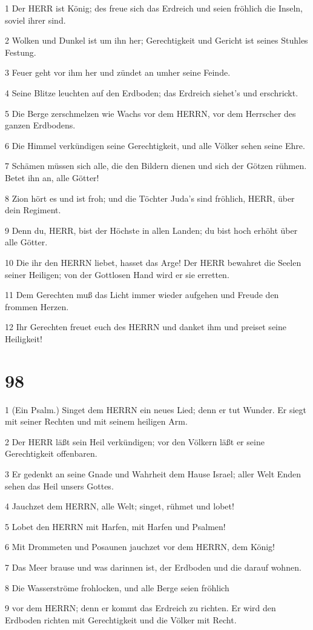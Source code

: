 \par 1 Der HERR ist König; des freue sich das Erdreich und seien fröhlich die Inseln, soviel ihrer sind.
\par 2 Wolken und Dunkel ist um ihn her; Gerechtigkeit und Gericht ist seines Stuhles Festung.
\par 3 Feuer geht vor ihm her und zündet an umher seine Feinde.
\par 4 Seine Blitze leuchten auf den Erdboden; das Erdreich siehet's und erschrickt.
\par 5 Die Berge zerschmelzen wie Wachs vor dem HERRN, vor dem Herrscher des ganzen Erdbodens.
\par 6 Die Himmel verkündigen seine Gerechtigkeit, und alle Völker sehen seine Ehre.
\par 7 Schämen müssen sich alle, die den Bildern dienen und sich der Götzen rühmen. Betet ihn an, alle Götter!
\par 8 Zion hört es und ist froh; und die Töchter Juda's sind fröhlich, HERR, über dein Regiment.
\par 9 Denn du, HERR, bist der Höchste in allen Landen; du bist hoch erhöht über alle Götter.
\par 10 Die ihr den HERRN liebet, hasset das Arge! Der HERR bewahret die Seelen seiner Heiligen; von der Gottlosen Hand wird er sie erretten.
\par 11 Dem Gerechten muß das Licht immer wieder aufgehen und Freude den frommen Herzen.
\par 12 Ihr Gerechten freuet euch des HERRN und danket ihm und preiset seine Heiligkeit!

\chapter{98}

\par 1 (Ein Psalm.) Singet dem HERRN ein neues Lied; denn er tut Wunder. Er siegt mit seiner Rechten und mit seinem heiligen Arm.
\par 2 Der HERR läßt sein Heil verkündigen; vor den Völkern läßt er seine Gerechtigkeit offenbaren.
\par 3 Er gedenkt an seine Gnade und Wahrheit dem Hause Israel; aller Welt Enden sehen das Heil unsers Gottes.
\par 4 Jauchzet dem HERRN, alle Welt; singet, rühmet und lobet!
\par 5 Lobet den HERRN mit Harfen, mit Harfen und Psalmen!
\par 6 Mit Drommeten und Posaunen jauchzet vor dem HERRN, dem König!
\par 7 Das Meer brause und was darinnen ist, der Erdboden und die darauf wohnen.
\par 8 Die Wasserströme frohlocken, und alle Berge seien fröhlich
\par 9 vor dem HERRN; denn er kommt das Erdreich zu richten. Er wird den Erdboden richten mit Gerechtigkeit und die Völker mit Recht.

